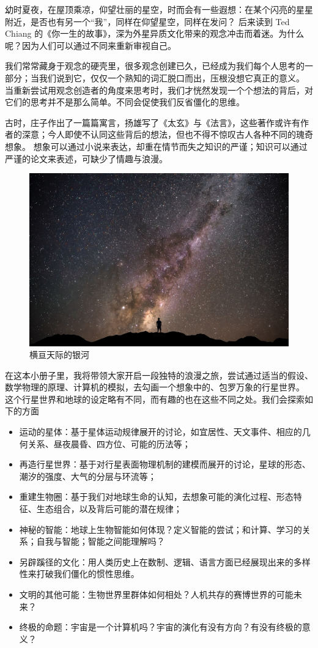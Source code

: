 \documentclass[a4paper,10.5pt]{book}
\begin{document}
幼时夏夜，在屋顶乘凉，仰望壮丽的星空，时而会有一些遐想：在某个闪亮的星星附近，是否也有另一个“我”，同样在仰望星空，同样在发问？
后来读到 Ted Chiang 的《你一生的故事》，深为外星异质文化带来的观念冲击而着迷。为什么呢？因为人们可以通过不同来重新审视自己。

我们常常藏身于观念的硬壳里，很多观念创建已久，已经成为我们每个人思考的一部分；当我们说到它，仅仅一个熟知的词汇脱口而出，压根没想它真正的意义。
当重新尝试用观念创造者的角度来思考时，我们才恍然发现一个个想法的背后，对它们的思考并不是那么简单。不同会促使我们反省僵化的思维。

古时，庄子作出了一篇篇寓言，扬雄写了《太玄》与《法言》，这些著作或许有作者的深意；今人即使不认同这些背后的想法，但也不得不惊叹古人各种不同的瑰奇想象。
想象可以通过小说来表达，却重在情节而失之知识的严谨；知识可以通过严谨的论文来表述，可缺少了情趣与浪漫。

\begin{figure}[ht]
\centering
\includegraphics[width=5in]{images/0_01-Lake_Ninan.jpg}
\caption{横亘天际的银河}
\end{figure}

在这本小册子里，我将带领大家开启一段独特的浪漫之旅，尝试通过适当的假设、数学物理的原理、计算机的模拟，去勾画一个想象中的、包罗万象的行星世界。
这个行星世界和地球的设定略有不同，而有趣的也在这些不同之处。我们会探索如下的方面

\begin{itemize}
\item 运动的星体：基于星体运动规律展开的讨论，如宜居性、天文事件、相应的几何关系、昼夜晨昏、四方位、可能的历法等；
\item 再造行星世界：基于对行星表面物理机制的建模而展开的讨论，星球的形态、潮汐的强度、大气的分层与环流等；
\item 重建生物圈：基于我们对地球生命的认知，去想象可能的演化过程、形态特征、生态组合，以及背后可能的潜在规律；
\item 神秘的智能：地球上生物智能如何体现？定义智能的尝试；和计算、学习的关系；自我与智能；智能之间能理解吗？
\item 另辟蹊径的文化：用人类历史上在数制、逻辑、语言方面已经展现出来的多样性来打破我们僵化的惯性思维。
\item 文明的其他可能：生物世界里群体如何相处？人机共存的赛博世界的可能未来？
\item 终极的命题：宇宙是一个计算机吗？宇宙的演化有没有方向？有没有终极的意义？
\end{itemize}
\end{document}
